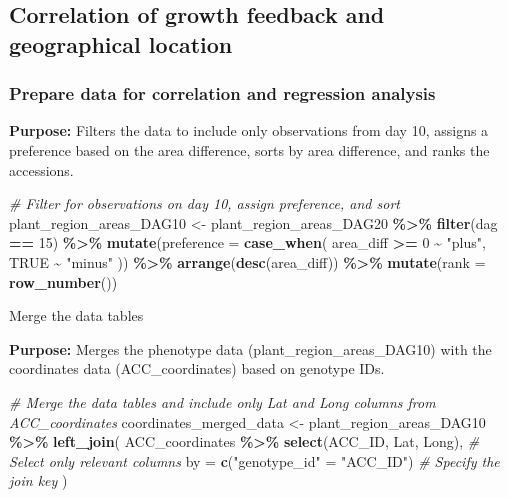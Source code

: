 \documentclass[
  11pt,
]{article}
\newenvironment{Shaded}{\begin{snugshade}}{\end{snugshade}}
\newcommand{\AttributeTok}[1]{\textcolor[rgb]{0.13,0.29,0.53}{#1}}
\newcommand{\CommentTok}[1]{\textcolor[rgb]{0.56,0.35,0.01}{\textit{#1}}}
\newcommand{\ConstantTok}[1]{\textcolor[rgb]{0.56,0.35,0.01}{#1}}
\newcommand{\DecValTok}[1]{\textcolor[rgb]{0.00,0.00,0.81}{#1}}
\newcommand{\FunctionTok}[1]{\textcolor[rgb]{0.13,0.29,0.53}{\textbf{#1}}}
\newcommand{\NormalTok}[1]{#1}
\newcommand{\OtherTok}[1]{\textcolor[rgb]{0.56,0.35,0.01}{#1}}
\newcommand{\SpecialCharTok}[1]{\textcolor[rgb]{0.81,0.36,0.00}{\textbf{#1}}}
\newcommand{\StringTok}[1]{\textcolor[rgb]{0.31,0.60,0.02}{#1}}
\begin{document}
\subsection{Correlation of growth feedback and geographical
location}\label{correlation-of-growth-feedback-and-geographical-location}

\subsubsection{Prepare data for correlation and regression
analysis}\label{prepare-data-for-correlation-and-regression-analysis}

\textbf{Purpose:} Filters the data to include only observations from day
10, assigns a preference based on the area difference, sorts by area
difference, and ranks the accessions.

\begin{Shaded}
\begin{Highlighting}[]
\CommentTok{\# Filter for observations on day 10, assign preference, and sort}
\NormalTok{plant\_region\_areas\_DAG10 }\OtherTok{\textless{}{-}}\NormalTok{ plant\_region\_areas\_DAG20 }\SpecialCharTok{\%\textgreater{}\%}
  \FunctionTok{filter}\NormalTok{(dag }\SpecialCharTok{==} \DecValTok{15}\NormalTok{) }\SpecialCharTok{\%\textgreater{}\%}
  \FunctionTok{mutate}\NormalTok{(}\AttributeTok{preference =} \FunctionTok{case\_when}\NormalTok{(}
\NormalTok{    area\_diff }\SpecialCharTok{\textgreater{}=} \DecValTok{0} \SpecialCharTok{\textasciitilde{}} \StringTok{"plus"}\NormalTok{,}
    \ConstantTok{TRUE} \SpecialCharTok{\textasciitilde{}} \StringTok{"minus"}
\NormalTok{  )) }\SpecialCharTok{\%\textgreater{}\%}
  \FunctionTok{arrange}\NormalTok{(}\FunctionTok{desc}\NormalTok{(area\_diff)) }\SpecialCharTok{\%\textgreater{}\%}
  \FunctionTok{mutate}\NormalTok{(}\AttributeTok{rank =} \FunctionTok{row\_number}\NormalTok{())}
\end{Highlighting}
\end{Shaded}

Merge the data tables

\textbf{Purpose:} Merges the phenotype data
(plant\_region\_areas\_DAG10) with the coordinates data
(ACC\_coordinates) based on genotype IDs.

\begin{Shaded}
\begin{Highlighting}[]
\CommentTok{\# Merge the data tables and include only Lat and Long columns from ACC\_coordinates}
\NormalTok{coordinates\_merged\_data }\OtherTok{\textless{}{-}}\NormalTok{ plant\_region\_areas\_DAG10 }\SpecialCharTok{\%\textgreater{}\%}
  \FunctionTok{left\_join}\NormalTok{(}
\NormalTok{    ACC\_coordinates }\SpecialCharTok{\%\textgreater{}\%} \FunctionTok{select}\NormalTok{(ACC\_ID, Lat, Long),  }\CommentTok{\# Select only relevant columns}
    \AttributeTok{by =} \FunctionTok{c}\NormalTok{(}\StringTok{"genotype\_id"} \OtherTok{=} \StringTok{"ACC\_ID"}\NormalTok{)               }\CommentTok{\# Specify the join key}
\NormalTok{  )}
\end{Highlighting}
\end{Shaded}
\end{document}

